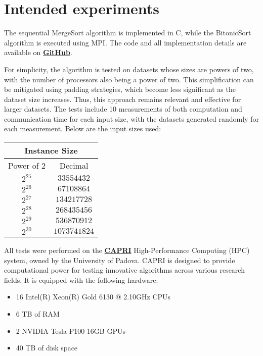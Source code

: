 \documentclass[article,12pt,conference]{ieeeconf} %
\begin{document}

\section{Intended experiments}
The sequential MergeSort algorithm is implemented in C, while the BitonicSort algorithm is executed using MPI. The code and all implementation details are available on \textbf{\href{https://github.com/francesco-biscaccia-carrara/BitonicSort}{GitHub}}. \par
For simplicity, the algorithm is tested on datasets whose sizes are powers of two, with the number of processors also being a power of two. This simplification can be mitigated using padding strategies, which become less significant as the dataset size increases. Thus, this approach remains relevant and effective for larger datasets.
The tests include 10 measurements of both computation and communication time for each input size, with the datasets generated randomly for each measurement. Below are the input sizes used:
\begin{center}
\begin{tabular}{|c||c|}
 \hline
 \multicolumn{2}{|c|}{Instance Size} \\
 \hline
 Power of 2& Decimal\\
 \hline
 $2^{25}$ & $33554432$\\
 $2^{26}$ & $67108864$\\
 $2^{27}$ & $134217728$\\
 $2^{28}$ & $268435456$\\
 $2^{29}$ & $536870912$\\
 $2^{30}$ & $1073741824$\\
 \hline
\end{tabular}
\end{center}
All tests were performed on the \textbf{\href{https://capri.dei.unipd.it}{CAPRI}} High-Performance Computing (HPC) system, owned by the University of Padova. CAPRI is designed to provide computational power for testing innovative algorithms across various research fields. It is equipped with the following hardware:
\begin{itemize}
    \item 16 Intel(R) Xeon(R) Gold 6130 @ 2.10GHz CPUs
    \item 6 TB of RAM
    \item 2 NVIDIA Tesla P100 16GB GPUs
    \item 40 TB of disk space
\end{itemize}
\end{document}
